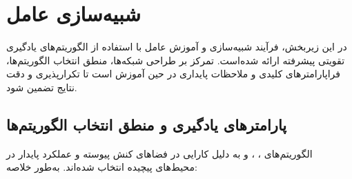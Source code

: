 \section{شبیه‌سازی عامل}\label{sec:agent_sim}

در این زیربخش، فرآیند شبیه‌سازی و آموزش عامل با استفاده از الگوریتم‌های یادگیری تقویتی پیشرفته ارائه شده‌است. تمرکز بر طراحی شبکه‌ها، منطق انتخاب الگوریتم‌ها، فراپارامترهای کلیدی و ملاحظات پایداری در حین آموزش است تا تکرارپذیری و دقت نتایج تضمین شود.

\subsection{پارامترهای یادگیری و منطق انتخاب الگوریتم‌ها}
الگوریتم‌های ، ،  و  به دلیل کارایی در فضاهای کنش پیوسته و عملکرد پایدار در محیط‌های پیچیده انتخاب شده‌اند. به‌طور خلاصه:
